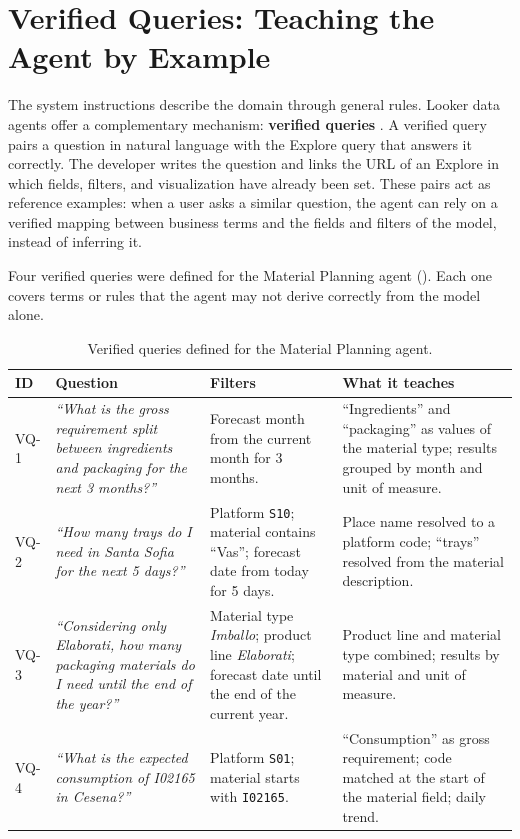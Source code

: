 \section[Verified Queries]{Verified Queries: Teaching the Agent by Example}
\label{sec:verified_queries}

The system instructions describe the domain through general rules. Looker data agents offer a complementary mechanism: \textbf{verified queries} \cite{googlecloudlookeragents2026}. A verified query pairs a question in natural language with the Explore query that answers it correctly. The developer writes the question and links the URL of an Explore in which fields, filters, and visualization have already been set. These pairs act as reference examples: when a user asks a similar question, the agent can rely on a verified mapping between business terms and the fields and filters of the model, instead of inferring it.

Four verified queries were defined for the Material Planning agent (). Each one covers terms or rules that the agent may not derive correctly from the model alone.

\begin{table}[htbp]
\centering
\small
\renewcommand{\arraystretch}{1.3}
\begin{tabularx}{\textwidth}{l >{\raggedright\arraybackslash}p{3.6cm} >{\raggedright\arraybackslash}X >{\raggedright\arraybackslash}X}
\hline
\textbf{ID} & \textbf{Question} & \textbf{Filters} & \textbf{What it teaches} \\ \hline
VQ-1 & \textit{``What is the gross requirement split between ingredients and packaging for the next 3 months?''} &
Forecast month from the current month for 3 months. &
``Ingredients'' and ``packaging'' as values of the material type; results grouped by month and unit of measure. \\ \hline
VQ-2 & \textit{``How many trays do I need in Santa Sofia for the next 5 days?''} &
Platform \texttt{S10}; material contains ``Vas''; forecast date from today for 5 days. &
Place name resolved to a platform code; ``trays'' resolved from the material description. \\ \hline
VQ-3 & \textit{``Considering only Elaborati, how many packaging materials do I need until the end of the year?''} &
Material type \textit{Imballo}; product line \textit{Elaborati}; forecast date until the end of the current year. &
Product line and material type combined; results by material and unit of measure. \\ \hline
VQ-4 & \textit{``What is the expected consumption of I02165 in Cesena?''} &
Platform \texttt{S01}; material starts with \texttt{I02165}. &
``Consumption'' as gross requirement; code matched at the start of the material field; daily trend. \\ \hline
\end{tabularx}
\caption{Verified queries defined for the Material Planning agent.}
\label{tab:verified_queries}
\end{table}


